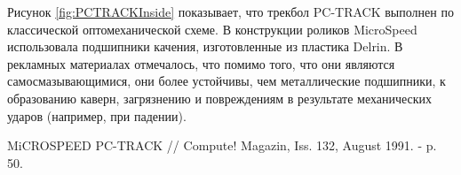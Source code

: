 \documentclass[11pt, a4paper]{article}
\begin{document}
Рисунок \ref{fig:PCTRACKInside} показывает, что трекбол PC-TRACK выполнен по классической оптомеханической схеме. В конструкции роликов MicroSpeed использовала подшипники качения, изготовленные из пластика Delrin. В рекламных материалах отмечалось, что помимо того, что они являются самосмазывающимися, они более устойчивы, чем металлические подшипники, к образованию каверн, загрязнению и повреждениям в результате механических ударов (например, при падении).

\begin{thebibliography}{9}
 MiCROSPEED PC-TRACK // Compute! Magazin,  Iss. 132, August 1991. - p. 50.
\end{thebibliography}
\end{document}
